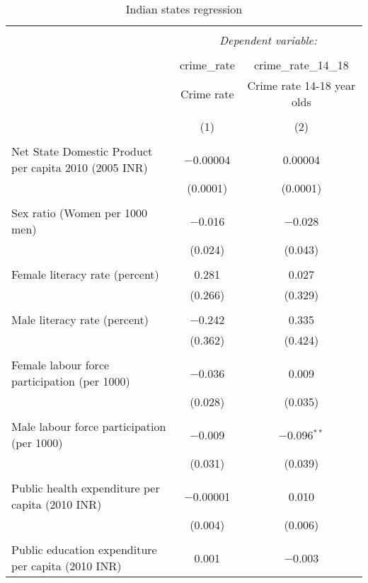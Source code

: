 
\begin{table}[!htbp] \centering 
  \caption{Indian states regression} 
  \label{} 
\begin{tabular}{@{\extracolsep{5pt}}lcc} 
\\[-1.8ex]\hline 
\hline \\[-1.8ex] 
 & \multicolumn{2}{c}{\textit{Dependent variable:}} \\ 
\cline{2-3} 
\\[-1.8ex] & crime\_rate & crime\_rate\_14\_18 \\ 
 & Crime rate & Crime rate 14-18 year olds \\ 
\\[-1.8ex] & (1) & (2)\\ 
\hline \\[-1.8ex] 
 Net State Domestic Product per capita 2010 (2005 INR) & $-$0.00004 & 0.00004 \\ 
  & (0.0001) & (0.0001) \\ 
  & & \\ 
 Sex ratio (Women per 1000 men) & $-$0.016 & $-$0.028 \\ 
  & (0.024) & (0.043) \\ 
  & & \\ 
 Female literacy rate (percent) & 0.281 & 0.027 \\ 
  & (0.266) & (0.329) \\ 
  & & \\ 
 Male literacy rate (percent) & $-$0.242 & 0.335 \\ 
  & (0.362) & (0.424) \\ 
  & & \\ 
 Female labour force participation (per 1000) & $-$0.036 & 0.009 \\ 
  & (0.028) & (0.035) \\ 
  & & \\ 
 Male labour force participation (per 1000) & $-$0.009 & $-$0.096$^{**}$ \\ 
  & (0.031) & (0.039) \\ 
  & & \\ 
 Public health expenditure per capita (2010 INR) & $-$0.00001 & 0.010 \\ 
  & (0.004) & (0.006) \\ 
  & & \\ 
 Public education expenditure per capita (2010 INR) & 0.001 & $-$0.003 \\ 

\end{tabular}
\end{table}

